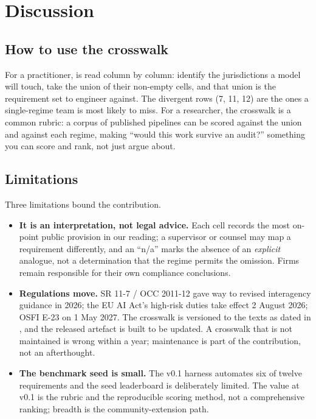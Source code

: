 \section{Discussion}\label{sec:discussion}

\subsection{How to use the crosswalk}\label{sec:use}

For a practitioner,  is read column by column: identify the jurisdictions a model will touch, take the union of their non-empty cells, and that union is the requirement set to engineer against. The divergent rows (7, 11, 12) are the ones a single-regime team is most likely to miss. For a researcher, the crosswalk is a common rubric: a corpus of published pipelines can be scored against the union and against each regime, making ``would this work survive an audit?'' something you can score and rank, not just argue about.

\subsection{Limitations}\label{sec:limitations}

Three limitations bound the contribution.

\begin{itemize}[leftmargin=*]
    \item \textbf{It is an interpretation, not legal advice.} Each cell records the most on-point public provision in our reading; a supervisor or counsel may map a requirement differently, and an ``n/a'' marks the absence of an \emph{explicit} analogue, not a determination that the regime permits the omission. Firms remain responsible for their own compliance conclusions.
    \item \textbf{Regulations move.} SR 11-7 / OCC 2011-12 gave way to revised interagency guidance in 2026; the EU AI Act's high-risk duties take effect 2 August 2026; OSFI E-23 on 1 May 2027. The crosswalk is versioned to the texts as dated in , and the released artefact is built to be updated. A crosswalk that is not maintained is wrong within a year; maintenance is part of the contribution, not an afterthought.
    \item \textbf{The benchmark seed is small.} The v0.1 harness automates six of twelve requirements and the seed leaderboard is deliberately limited. The value at v0.1 is the rubric and the reproducible scoring method, not a comprehensive ranking; breadth is the community-extension path.
\end{itemize}

